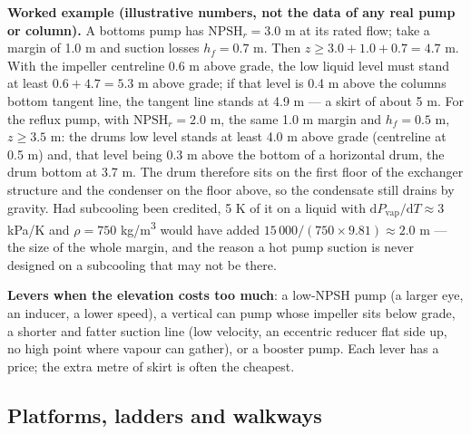 \documentclass[11pt,a4paper]{article}
\begin{document}
\textbf{Worked example (illustrative numbers, not the data of any real
pump or column).} A bottoms pump has \(\mathrm{NPSH}_r = 3.0\) m at its
rated flow; take a margin of 1.0 m and suction losses \(h_f = 0.7\) m.
Then \(z \ge 3.0 + 1.0 + 0.7 = 4.7\) m. With the impeller centreline
0.6 m above grade, the low liquid level must stand at least
\(0.6 + 4.7 = 5.3\) m above grade; if that level is 0.4 m above the
column\textquotesingle s bottom tangent line, the tangent line stands at
4.9 m --- a skirt of about 5 m. For the reflux pump, with
\(\mathrm{NPSH}_r = 2.0\) m, the same 1.0 m margin and \(h_f = 0.5\) m,
\(z \ge 3.5\) m: the drum\textquotesingle s low level stands at least
4.0 m above grade (centreline at 0.5 m) and, that level being 0.3 m above
the bottom of a horizontal drum, the drum bottom at 3.7 m. The drum
therefore sits on the first floor of the exchanger structure and the
condenser on the floor above, so the condensate still drains by gravity.
Had subcooling been credited, 5 K of it on a liquid with
\(\mathrm{d}P_\mathrm{vap}/\mathrm{d}T \approx 3\) kPa/K and
\(\rho = 750\) kg/m\textsuperscript{3} would have added
\(15\,000/(750 \times 9.81) \approx 2.0\) m --- the size of the whole
margin, and the reason a hot pump suction is never designed on a
subcooling that may not be there.

\textbf{Levers when the elevation costs too much}: a low-NPSH pump (a
larger eye, an inducer, a lower speed), a vertical can pump whose
impeller sits below grade, a shorter and fatter suction line (low
velocity, an eccentric reducer flat side up, no high point where vapour
can gather), or a booster pump. Each lever has a price; the extra metre
of skirt is often the cheapest.

\hypertarget{platforms-ladders-and-walkways}{%
\subsection{Platforms, ladders and
walkways}\label{platforms-ladders-and-walkways}}
\end{document}
